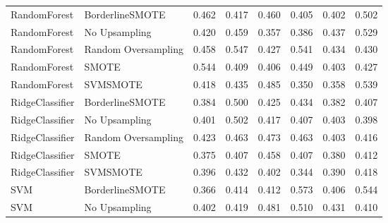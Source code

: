\begin{tabular}{llllllll}
                RandomForest &     BorderlineSMOTE & 0.462 &                     0.417 &                 0.460 &                  0.405 &                                   0.402 &    0.502 \\
                RandomForest &       No Upsampling & 0.420 &                     0.459 &                 0.357 &                  0.386 &                                   0.437 &    0.529 \\
                RandomForest & Random Oversampling & 0.458 &                     0.547 &                 0.427 &                  0.541 &                                   0.434 &    0.430 \\
                RandomForest &               SMOTE & 0.544 &                     0.409 &                 0.406 &                  0.449 &                                   0.403 &    0.427 \\
                RandomForest &            SVMSMOTE & 0.418 &                     0.435 &                 0.485 &                  0.350 &                                   0.358 &    0.539 \\
             RidgeClassifier &     BorderlineSMOTE & 0.384 &                     0.500 &                 0.425 &                  0.434 &                                   0.382 &    0.407 \\
             RidgeClassifier &       No Upsampling & 0.401 &                     0.502 &                 0.417 &                  0.407 &                                   0.403 &    0.398 \\
             RidgeClassifier & Random Oversampling & 0.423 &                     0.463 &                 0.473 &                  0.463 &                                   0.403 &    0.416 \\
             RidgeClassifier &               SMOTE & 0.375 &                     0.407 &                 0.458 &                  0.407 &                                   0.380 &    0.412 \\
             RidgeClassifier &            SVMSMOTE & 0.396 &                     0.432 &                 0.402 &                  0.344 &                                   0.390 &    0.418 \\
                         SVM &     BorderlineSMOTE & 0.366 &                     0.414 &                 0.412 &                  0.573 &                                   0.406 &    0.544 \\
                         SVM &       No Upsampling & 0.402 &                     0.419 &                 0.481 &                  0.510 &                                   0.431 &    0.410 \\

\end{tabular}
